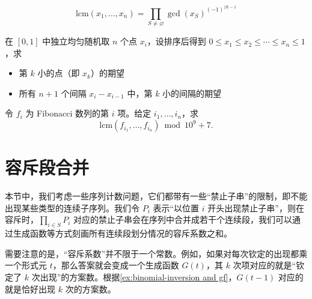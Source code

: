 \begin{corollary}
    $$
    \mathrm{lcm}(x_1,\ldots,x_n)=\prod_{S\ne \varnothing}\gcd(x_S)^{(-1)^{|S|-1}}
    $$
\end{corollary}
\begin{exercise}
    在 $[0,1]$ 中独立均匀随机取 $n$ 个点 $x_i$，设排序后得到 $0\le x_1\le x_2\le \cdots \le x_n\le 1$，求
    \begin{itemize}
        \item 第 $k$ 小的点（即 $x_k$）的期望
        \item 所有 $n+1$ 个间隔 $x_i-x_{i-1}$ 中，第 $k$ 小的间隔的期望
    \end{itemize}
\end{exercise}

\begin{exercise}[P4707 重返现世]
    
\end{exercise}

\begin{exercise}[LOJ6102]
    令 $f_i$ 为 Fibonacci 数列的第 $i$ 项。给定 $i_1,\ldots,i_n$，求
    $$
    \mathrm{lcm}(f_{i_1},\ldots,f_{i_n})\bmod 10^9+7.
    $$
\end{exercise}

\section{容斥段合并}


本节中，我们考虑一些序列计数问题，它们都带有一些“禁止子串”的限制，即不能出现某些类型的连续子序列。我们令 $P_i$ 表示“以位置 $i$ 开头出现禁止子串”，则在容斥时，$\prod_{i\in S}P_i$ 对应的禁止子串会在序列中合并成若干个连续段，我们可以通过生成函数等方式刻画所有连续段划分情况的容斥系数之和。

需要注意的是，“容斥系数”并不限于一个常数。例如，如果对每次钦定的出现都乘一个形式元 $t$，那么答案就会变成一个生成函数 $G(t)$，其 $k$ 次项对应的就是“钦定了 $k$ 次出现”的方案数。根据\cref{ex:binomial-inversion and gf}，$G(t-1)$ 对应的就是恰好出现 $k$ 次的方案数。

